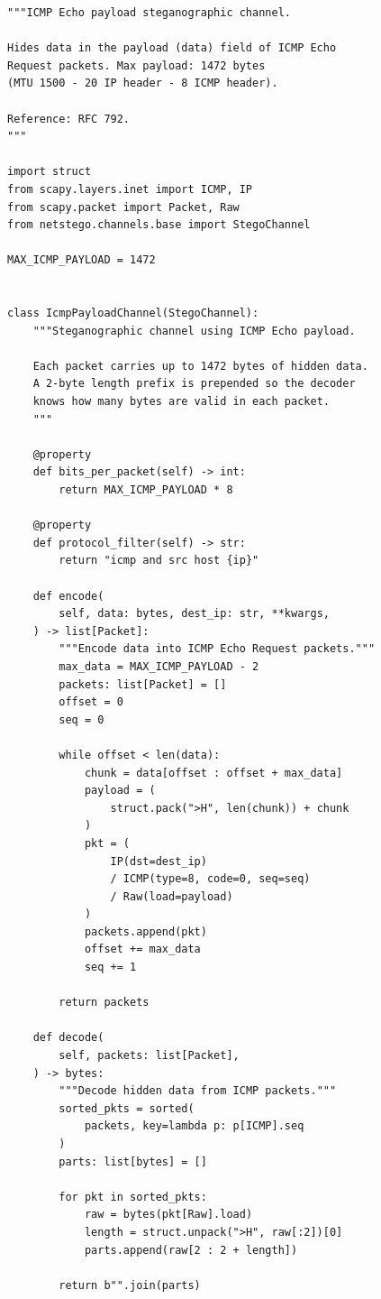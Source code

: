 \begin{lstlisting}[style=appendixcode]
"""ICMP Echo payload steganographic channel.

Hides data in the payload (data) field of ICMP Echo
Request packets. Max payload: 1472 bytes
(MTU 1500 - 20 IP header - 8 ICMP header).

Reference: RFC 792.
"""

import struct
from scapy.layers.inet import ICMP, IP
from scapy.packet import Packet, Raw
from netstego.channels.base import StegoChannel

MAX_ICMP_PAYLOAD = 1472


class IcmpPayloadChannel(StegoChannel):
    """Steganographic channel using ICMP Echo payload.

    Each packet carries up to 1472 bytes of hidden data.
    A 2-byte length prefix is prepended so the decoder
    knows how many bytes are valid in each packet.
    """

    @property
    def bits_per_packet(self) -> int:
        return MAX_ICMP_PAYLOAD * 8

    @property
    def protocol_filter(self) -> str:
        return "icmp and src host {ip}"

    def encode(
        self, data: bytes, dest_ip: str, **kwargs,
    ) -> list[Packet]:
        """Encode data into ICMP Echo Request packets."""
        max_data = MAX_ICMP_PAYLOAD - 2
        packets: list[Packet] = []
        offset = 0
        seq = 0

        while offset < len(data):
            chunk = data[offset : offset + max_data]
            payload = (
                struct.pack(">H", len(chunk)) + chunk
            )
            pkt = (
                IP(dst=dest_ip)
                / ICMP(type=8, code=0, seq=seq)
                / Raw(load=payload)
            )
            packets.append(pkt)
            offset += max_data
            seq += 1

        return packets

    def decode(
        self, packets: list[Packet],
    ) -> bytes:
        """Decode hidden data from ICMP packets."""
        sorted_pkts = sorted(
            packets, key=lambda p: p[ICMP].seq
        )
        parts: list[bytes] = []

        for pkt in sorted_pkts:
            raw = bytes(pkt[Raw].load)
            length = struct.unpack(">H", raw[:2])[0]
            parts.append(raw[2 : 2 + length])

        return b"".join(parts)
\end{lstlisting}

